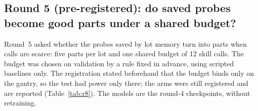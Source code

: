 \begin{table}[!htbp]
  \centering\small
  \setlength{\tabcolsep}{4pt}
  \caption{Round 4, \textbf{exploratory} crush-gated rule on fresh lots ($n = 30$): good parts / probes per
  lot, and paired differences. Bold: CI excludes 0 in the favourable direction.}
  \label{tab:r7v2}
\end{table}

\subsection{Round 5 (pre-registered): do saved probes become good parts under a shared budget?}
\label{sec:res-r8}

Round~5 asked whether the probes saved by lot memory turn into parts when calls are scarce: five parts per lot
and one shared budget of 12 skill calls. The budget was chosen on validation by a rule fixed in advance, using
scripted baselines only. The registration stated beforehand that the budget binds only on the gantry, so the
test had power only there; the arms were still registered and are reported (Table~\ref{tab:r8}). The models
are the round-4 checkpoints, without retraining.

